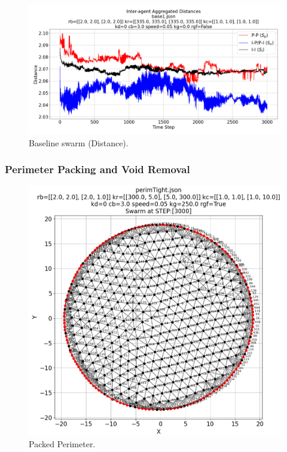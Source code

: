 \documentclass[12pt,a4paper]{IEEEtran}
\begin{document}
\begin{figure}[H]
	\begin{center}
		\includegraphics[width=1.0\linewidth]{figures/baselineDistance}
	\end{center}
	\caption{Baseline swarm (Distance). \label{fig:baselineDistance}}
\end{figure}

\subsubsection{Perimeter Packing and Void Removal}\label{sec:perimCompress}

\begin{figure}[H]
	\begin{center}
		\includegraphics[width=1.0\linewidth]{figures/tightPerim}
	\end{center}
	\caption{Packed Perimeter. \label{fig:tightPerim}}
\end{figure}
\end{document}
